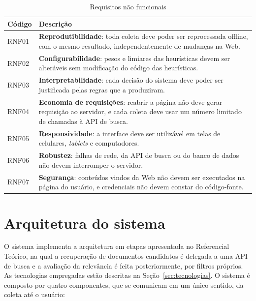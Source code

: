 \begin{table}[htbp]
\centering
\caption{Requisitos não funcionais}
\label{tab:rnf}
\small
\begin{tabularx}{\textwidth}{l X}
\toprule
Código & Descrição \\
\midrule
RNF01 & \textbf{Reprodutibilidade}: toda coleta deve poder ser reprocessada
        offline, com o mesmo resultado, independentemente de mudanças na Web. \\
RNF02 & \textbf{Configurabilidade}: pesos e limiares das heurísticas devem ser
        alteráveis sem modificação do código das heurísticas. \\
RNF03 & \textbf{Interpretabilidade}: cada decisão do sistema deve poder ser
        justificada pelas regras que a produziram. \\
RNF04 & \textbf{Economia de requisições}: reabrir a página não deve gerar
        requisição ao servidor, e cada coleta deve usar um número limitado de
        chamadas à API de busca. \\
RNF05 & \textbf{Responsividade}: a interface deve ser utilizável em telas de
        celulares, \textit{tablets} e computadores. \\
RNF06 & \textbf{Robustez}: falhas de rede, da API de busca ou do banco de
        dados não devem interromper o servidor. \\
RNF07 & \textbf{Segurança}: conteúdos vindos da Web não devem ser executados na
        página do usuário, e credenciais não devem constar do código-fonte. \\
\bottomrule
\end{tabularx}
\end{table}

\section{Arquitetura do sistema}
\label{sec:arquitetura}

O sistema implementa a arquitetura em etapas apresentada no Referencial
Teórico, na qual a recuperação de documentos candidatos é delegada a uma API de
busca e a avaliação da relevância é feita posteriormente, por filtros próprios.
As tecnologias empregadas estão descritas na Seção~\ref{sec:tecnologias}. O
sistema é composto por quatro componentes, que se comunicam em um único
sentido, da coleta até o usuário:

